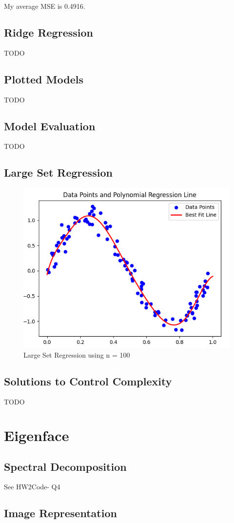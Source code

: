 \documentclass{article}
\begin{document}
My average MSE is 0.4916.

\subsection{Ridge Regression}
TODO
\subsection{Plotted Models}
TODO
\subsection{Model Evaluation}
TODO

\subsection{Large Set Regression}

\begin{figure}
    \centering
    \includegraphics[width=0.5\linewidth]{3.5 LargeSet Regression Graph.png}
    \caption{Large Set Regression using n = 100}
\end{figure}

\subsection{Solutions to Control Complexity}
TODO

\newpage
\section{Eigenface}
\subsection{Spectral Decomposition}

See HW2Code- Q4

\subsection{Image Representation}
\end{document}

